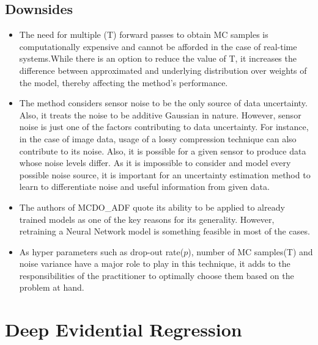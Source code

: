 	\subsection{Downsides}
	\begin{itemize}
		\item The need for multiple (T) forward passes to obtain MC samples is computationally expensive and cannot be afforded in the case of real-time systems.While there is an option to reduce the value of T, it increases the difference between approximated and underlying distribution over weights of the model, thereby affecting the method's performance. 
		\item The method considers sensor noise to be the only source of data uncertainty. Also, it treats the noise to be additive Gaussian in nature. However, sensor noise is just one of the factors contributing to data uncertainty. For instance, in the case of image data, usage of a lossy compression technique can also contribute to its noise. Also, it is possible for a given sensor to produce data whose noise levels differ. As it is impossible to consider and model every possible noise source, it is important for an uncertainty estimation method to learn to differentiate noise and useful information from given data.
		\item The authors of MCDO\_ADF quote its ability to be applied to already trained models as one of the key reasons for its generality. However, retraining a Neural Network model is something feasible in most of the cases.
		\item As hyper parameters such as drop-out rate($p$), number of MC samples(T) and noise variance have a major role to play in this technique, it adds to the responsibilities of the practitioner to optimally choose them based on the problem at hand.
	\end{itemize}    
	
	\section{Deep Evidential Regression}\label{der}
	
